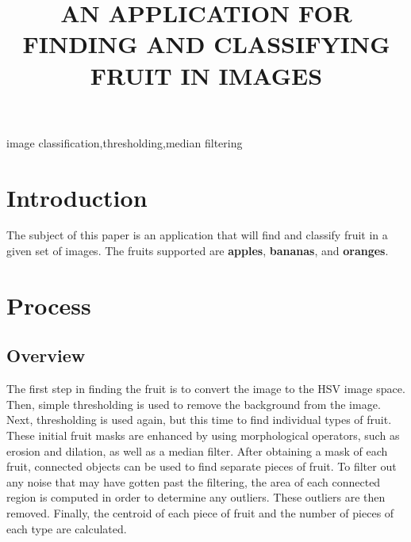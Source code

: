 \documentclass{article}
\begin{document}
\sloppy

\def\x{{\mathbf x}}
\def\L{{\cal L}}


\title{AN APPLICATION FOR FINDING AND CLASSIFYING FRUIT IN IMAGES}
%
\address{Rose-Hulman Institute of Technology}


\maketitle
\thispagestyle{fancy} \fancyhead{} \lhead{}
\renewcommand{\headrulewidth}{0pt}
\renewcommand{\footrulewidth}{0pt}




%
\begin{abstract}

\end{abstract}
%
\begin{keywords}
image classification,thresholding,median filtering
\end{keywords}
%
\section{Introduction}
\label{sec:intro}

The subject of this paper is an application that will find and classify fruit in a given set of images.
The fruits supported are \textbf{apples}, \textbf{bananas}, and \textbf{oranges}.


\section{Process}
\label{sec:process}
\subsection{Overview}
\label{subsec:process:overview}

The first step in finding the fruit is to convert the image to the HSV image space.  Then, simple thresholding is used to remove the background from the image.  Next, thresholding is used again, but this time to find individual types of fruit.  These initial fruit masks are enhanced by using morphological operators, such as erosion and dilation, as well as a median filter.  After obtaining a mask of each fruit, connected objects can be used to find separate pieces of fruit.  To filter out any noise that may have gotten past the filtering, the area of each connected region is computed in order to determine any outliers.  These outliers are then removed.  Finally, the centroid of each piece of fruit and the number of pieces of each type are calculated.
\end{document}
